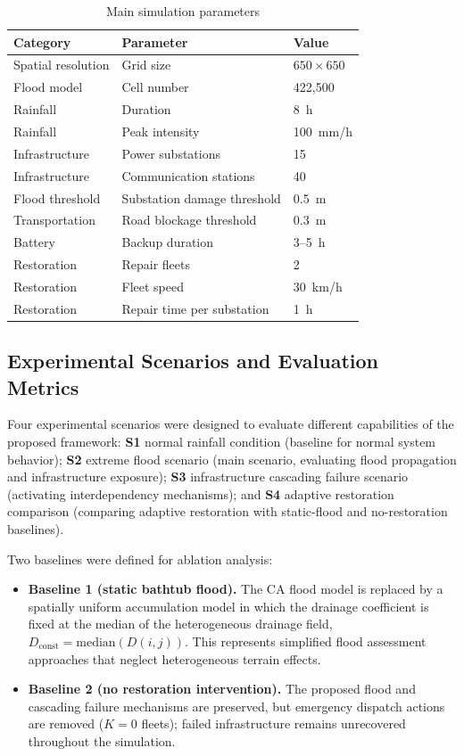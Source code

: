 \documentclass[preprint,12pt]{elsarticle}
\begin{document}
\begin{table}[H]
\centering
\caption{Main simulation parameters}
\label{tab:parameters}
\begin{tabular}{lll}
\toprule
Category & Parameter & Value \\
\midrule
Spatial resolution & Grid size & $650\times650$ \\
Flood model & Cell number & 422{,}500 \\
Rainfall & Duration & 8~h \\
Rainfall & Peak intensity & 100~mm/h \\
Infrastructure & Power substations & 15 \\
Infrastructure & Communication stations & 40 \\
Flood threshold & Substation damage threshold & 0.5~m \\
Transportation & Road blockage threshold & 0.3~m \\
Battery & Backup duration & 3--5~h \\
Restoration & Repair fleets & 2 \\
Restoration & Fleet speed & 30~km/h \\
Restoration & Repair time per substation & 1~h \\
\bottomrule
\end{tabular}
\end{table}

\subsection{Experimental Scenarios and Evaluation Metrics}
Four experimental scenarios were designed to evaluate different capabilities
of the proposed framework: \textbf{S1} normal rainfall condition (baseline
for normal system behavior); \textbf{S2} extreme flood scenario (main
scenario, evaluating flood propagation and infrastructure exposure);
\textbf{S3} infrastructure cascading failure scenario (activating
interdependency mechanisms); and \textbf{S4} adaptive restoration comparison
(comparing adaptive restoration with static-flood and no-restoration
baselines).

Two baselines were defined for ablation analysis:
\begin{itemize}
\item \textbf{Baseline 1 (static bathtub flood).} The CA flood model is
replaced by a spatially uniform accumulation model in which the drainage
coefficient is fixed at the median of the heterogeneous drainage field,
$D_{\mathrm{const}} = \mathrm{median}(D(i,j))$. This represents simplified
flood assessment approaches that neglect heterogeneous terrain effects.
\item \textbf{Baseline 2 (no restoration intervention).} The proposed flood
and cascading failure mechanisms are preserved, but emergency dispatch
actions are removed ($K=0$ fleets); failed infrastructure remains
unrecovered throughout the simulation.
\end{itemize}
\end{document}
